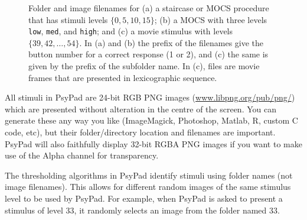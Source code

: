 \documentclass{article}
\begin{document}
\begin{figure}
\begin{center}
\caption{\label{fig-egImages}Folder and image filenames for (a) a staircase or MOCS 
procedure that has stimuli levels 
$\{0,5,10,15\}$; (b) a MOCS with three levels {\tt low}, {\tt med}, and {\tt high}; and 
(c) a movie stimulus with levels $\{39,42,\ldots,54\}$.
In (a) and (b) the prefix of the filenames give the button number for a correct response (1 or 2), and
(c) the same is given by the prefix of the subfolder name.
In (c), files are movie frames that are presented in lexicographic sequence.
}
\end{center}
\end{figure}



All stimuli in PsyPad are 24-bit RGB PNG images 
(\url{www.libpng.org/pub/png/}) which
are presented without alteration in the centre of the screen.
You can generate these any way you
like (ImageMagick, Photoshop, Matlab, R, custom C code, etc), but 
their folder/directory location and filenames are
important.
PsyPad will also faithfully display 32-bit RGBA PNG images if
you want to make use of the Alpha channel for transparency.

The thresholding algorithms in PsyPad identify stimuli using folder
names (not image filenames).  This allows for different random
images of the same stimulus level to be used by PsyPad.
For example, when PsyPad is asked to present a stimulus
of level 33, it randomly selects an image from the folder named 33.
\end{document}
